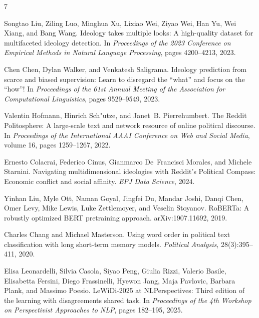 \documentclass[11pt,twocolumn]{article}
\begin{document}
\clearpage
\begin{thebibliography}{7}

Songtao Liu, Ziling Luo, Minghua Xu, Lixiao Wei, Ziyao Wei, Han Yu, Wei Xiang, and Bang Wang.
\newblock Ideology takes multiple looks: A high-quality dataset for multifaceted ideology detection.
\newblock In \emph{Proceedings of the 2023 Conference on Empirical Methods in Natural Language Processing}, pages 4200--4213, 2023.

Chen Chen, Dylan Walker, and Venkatesh Saligrama.
\newblock Ideology prediction from scarce and biased supervision: Learn to disregard the ``what'' and focus on the ``how''!
\newblock In \emph{Proceedings of the 61st Annual Meeting of the Association for Computational Linguistics}, pages 9529--9549, 2023.

Valentin Hofmann, Hinrich Sch{"u}tze, and Janet~B. Pierrehumbert.
\newblock The Reddit Politosphere: A large-scale text and network resource of online political discourse.
\newblock In \emph{Proceedings of the International AAAI Conference on Web and Social Media}, volume 16, pages 1259--1267, 2022.

Ernesto Colacrai, Federico Cinus, Gianmarco De~Francisci Morales, and Michele Starnini.
\newblock Navigating multidimensional ideologies with Reddit's Political Compass: Economic conflict and social affinity.
\newblock \emph{EPJ Data Science}, 2024.

Yinhan Liu, Myle Ott, Naman Goyal, Jingfei Du, Mandar Joshi, Danqi Chen, Omer Levy, Mike Lewis, Luke Zettlemoyer, and Veselin Stoyanov.
\newblock RoBERTa: A robustly optimized BERT pretraining approach.
\newblock arXiv:1907.11692, 2019.

Charles Chang and Michael Masterson.
\newblock Using word order in political text classification with long short-term memory models.
\newblock \emph{Political Analysis}, 28(3):395--411, 2020.

Elisa Leonardelli, Silvia Casola, Siyao Peng, Giulia Rizzi, Valerio Basile, Elisabetta Fersini, Diego Frassinelli, Hyewon Jang, Maja Pavlovic, Barbara Plank, and Massimo Poesio.
\newblock LeWiDi-2025 at NLPerspectives: Third edition of the learning with disagreements shared task.
\newblock In \emph{Proceedings of the 4th Workshop on Perspectivist Approaches to NLP}, pages 182--195, 2025.

\end{thebibliography}
\end{document}
